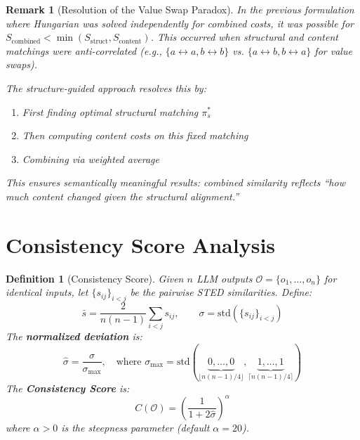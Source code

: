 \documentclass{article}
\newtheorem{definition}[theorem]{Definition}
\newtheorem{remark}[theorem]{Remark}
\begin{document}
\begin{remark}[Resolution of the Value Swap Paradox]
In the previous formulation where Hungarian was solved independently for combined costs, it was possible for $S_{\text{combined}} < \min(S_{\text{struct}}, S_{\text{content}})$. This occurred when structural and content matchings were anti-correlated (e.g., $\{a\!\leftrightarrow\!a, b\!\leftrightarrow\!b\}$ vs. $\{a\!\leftrightarrow\!b, b\!\leftrightarrow\!a\}$ for value swaps).

The structure-guided approach resolves this by:
\begin{enumerate}
    \item First finding optimal structural matching $\pi_s^*$
    \item Then computing content costs on this fixed matching
    \item Combining via weighted average
\end{enumerate}

This ensures semantically meaningful results: combined similarity reflects ``how much content changed given the structural alignment.''
\end{remark}

\section{Consistency Score Analysis}

\begin{definition}[Consistency Score]
\label{def:consistency}
Given $n$ LLM outputs $\mathcal{O} = \{o_1, \ldots, o_n\}$ for identical inputs, let $\{s_{ij}\}_{i<j}$ be the pairwise STED similarities. Define:
\begin{equation}
    \bar{s} = \frac{2}{n(n-1)} \sum_{i<j} s_{ij}, \qquad \sigma = \text{std}(\{s_{ij}\}_{i<j})
\end{equation}
The \textbf{normalized deviation} is:
\begin{equation}
    \hat{\sigma} = \frac{\sigma}{\sigma_{\max}}, \quad \text{where } \sigma_{\max} = \text{std}(\underbrace{0,\ldots,0}_{\lfloor n(n-1)/4 \rfloor}, \underbrace{1,\ldots,1}_{\lceil n(n-1)/4 \rceil})
\end{equation}
The \textbf{Consistency Score} is:
\begin{equation}
    C(\mathcal{O}) = \left(\frac{1}{1 + 2\hat{\sigma}}\right)^\alpha
\end{equation}
where $\alpha > 0$ is the steepness parameter (default $\alpha = 20$).
\end{definition}
\end{document}
